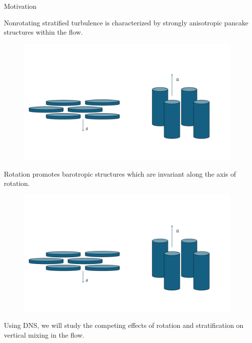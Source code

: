 \documentclass[aspecttatio=169]{beamer}
\begin{document}
\begin{frame}{Motivation}
    {\footnotesize
    Nonrotating stratified turbulence is characterized by strongly
    anisotropic pancake structures within the flow. 
    \begin{figure}
        \centering
        \includegraphics[width=.9\textwidth]{images/pancakes.pdf}
    \end{figure}
    } %
\emp
\hspace{6pt}
    {\footnotesize
    Rotation promotes barotropic structures which are invariant along the axis
    of rotation.
    
    \begin{figure}
        \centering
        \includegraphics[width=.9\textwidth]{images/cylinders.pdf}
    \end{figure}
    } %
\emp

\vspace{10pt}

Using DNS, we will study the competing effects of rotation and
stratification on vertical mixing in the flow. 

\end{frame}
\end{document}
